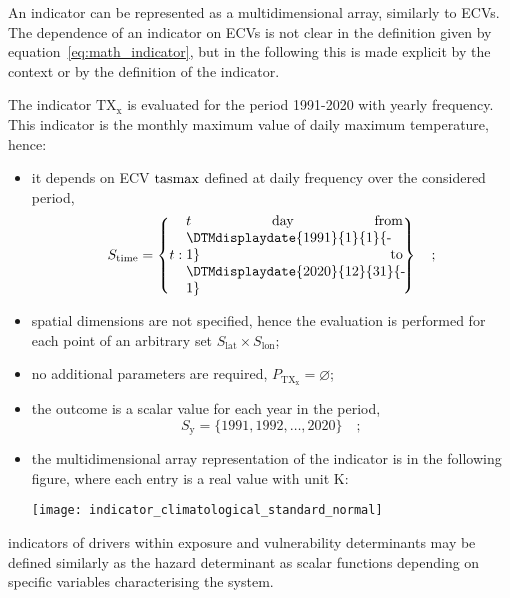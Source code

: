 An \gls{indicator} can be represented as a multidimensional array, similarly to \glspl{ECV}.
The dependence of an \gls{indicator} on \glspl{ECV} is not clear in the definition given by equation~\eqref{eq:math_indicator}, but in the following this is made explicit by the context or by the definition of the \gls{indicator}.

\begin{example}
  The \gls{indicator} $\mathrm{TX_x}$ is evaluated for the period 1991-2020 with yearly frequency. This \gls{indicator} is the monthly maximum value of daily maximum temperature,\cite{ETCCDIClimate} hence:
  \begin{itemize}
    \item it depends on \gls{ECV} $\mathrm{tasmax}$ defined at daily frequency over the considered period,
      \begin{equation*}
        S_\text{time} = \left\{ t : \parbox{0.45\linewidth}{$t$ day from \DTMdisplaydate{1991}{1}{1}{-1} to \DTMdisplaydate{2020}{12}{31}{-1}} \right\}
        \quad ;
      \end{equation*}
    \item spatial dimensions are not specified, hence the evaluation is performed for each point of an arbitrary set $S_\text{lat} \times S_\text{lon}$;
    \item no additional parameters are required, $P_\mathrm{TX_x} = \varnothing$;
    \item the outcome is a scalar value for each year in the period,
      \begin{equation*}
        S_\text{y} = \{ 1991, 1992, \dots, 2020 \}
        \quad ;
      \end{equation*}
    \item the multidimensional array representation of the \gls{indicator} is in the following figure, where each entry is a real value with unit \unit{\kelvin}:
      \begin{center}
        \texttt{[image: indicator\_climatological\_standard\_normal]}
      \end{center}
  \end{itemize}
\end{example}

\Glspl{indicator} of \glspl{driver} within \gls{exposure} and \gls{vulnerability} \glspl{determinant} may be defined similarly as the \gls{hazard} \gls{determinant} as scalar functions depending on specific variables characterising the system.
